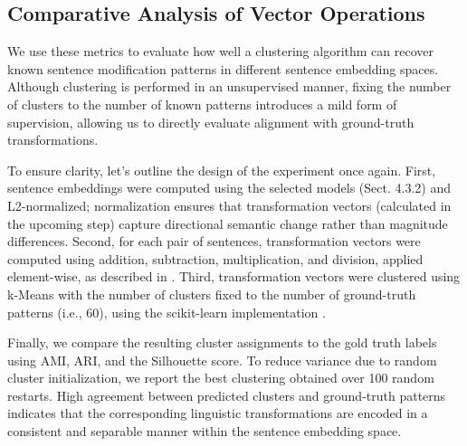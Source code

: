 \begin{itemize}
 \end{itemize}   



\subsection{Comparative Analysis of Vector Operations}
\label{sect:lin-spaces:analysis}

We use these metrics to evaluate how well a clustering algorithm can recover known sentence modification patterns in different sentence embedding spaces. Although clustering is performed in an unsupervised manner, fixing the number of clusters to the number of known patterns introduces a mild form of supervision, allowing us to directly evaluate alignment with ground-truth transformations.

To ensure clarity, let's outline the design of the experiment once again. First, sentence embeddings were computed using the selected models (Sect. 4.3.2) and  L2-normalized; normalization ensures that transformation vectors (calculated in the upcoming step) capture directional semantic change rather than magnitude differences. 
Second, for each pair of sentences, transformation vectors were computed using addition, subtraction, multiplication, and division, applied element-wise, as described in .
Third, transformation vectors were clustered using k-Means with the number of clusters fixed to the number of ground-truth patterns (i.e., 60), using the scikit-learn implementation \citep{scikit-learn}. 

Finally, we compare the resulting cluster assignments to the gold truth labels using AMI, ARI, and the Silhouette score. To reduce variance due to random cluster initialization, we report the best clustering obtained over 100 random restarts. High agreement between predicted clusters and ground-truth patterns indicates that the corresponding linguistic transformations are encoded in a consistent and separable manner within the sentence embedding space.


